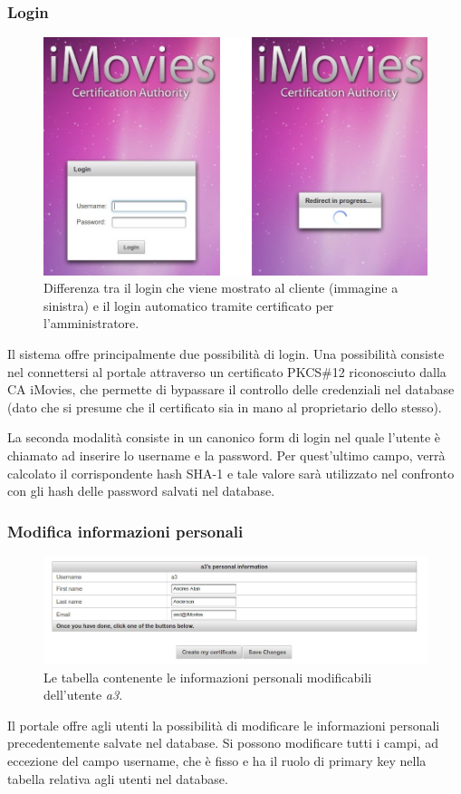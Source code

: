 \documentclass{article}
\begin{document}
\subsubsection*{Login}
\begin{figure}[h!]
\centering
\includegraphics[width=\textwidth]{img/login}
\caption{Differenza tra il login che viene mostrato al cliente (immagine a sinistra) e il login automatico tramite certificato per l'amministratore.}
\end{figure}
Il sistema offre principalmente due possibilità di login. Una possibilità consiste nel connettersi al portale attraverso un certificato PKCS\#12 riconosciuto dalla CA iMovies, che permette di bypassare il controllo delle credenziali nel database (dato che si presume che il certificato sia in mano al proprietario dello stesso).
\par La seconda modalità consiste in un canonico form di login nel quale l'utente è chiamato ad inserire lo username e la password. Per quest'ultimo campo, verrà calcolato il corrispondente hash SHA-1 e tale valore sarà utilizzato nel confronto con gli hash delle password salvati nel database.
\subsubsection*{Modifica informazioni personali}
\begin{figure}[h!]
\centering
\includegraphics[width=\textwidth]{img/edit}
\caption{Le tabella contenente le informazioni personali modificabili dell'utente \emph{a3}.}
\end{figure}
Il portale offre agli utenti la possibilità di modificare le informazioni personali precedentemente salvate nel database. Si possono modificare tutti i campi, ad eccezione del campo username, che è fisso e ha il ruolo di primary key nella tabella relativa agli utenti nel database.
\end{document}
